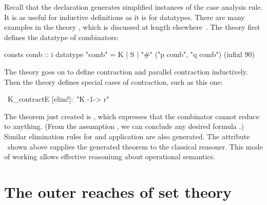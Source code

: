 Recall that the  declaration generates
simplified instances of the case analysis rule.  It is as useful for
inductive definitions as it is for datatypes.  There are many examples
in the theory
, which is discussed at length
elsewhere~\cite{paulson-generic}.  The theory first defines the
datatype
 of combinators:
\begin{alltt*}\isastyleminor
consts comb :: i
datatype  "comb" = K
                 | S
                 | "#" ("p \isasymin comb", "q \isasymin comb")   (infixl 90)
\end{alltt*}
The theory goes on to define contraction and parallel contraction
inductively.  Then the theory  defines special
cases of contraction, such as this one:
\begin{isabelle}
\ K\_contractE [elim!]:\ "K -1-> r"
\end{isabelle}
The theorem just created is ,
which expresses that the combinator  cannot reduce to
anything.  (From the assumption , we can conclude any desired
formula \@.)  Similar elimination rules for  and application are also
generated. The attribute \ shown above supplies the generated
theorem to the classical reasoner.  This mode of working allows
effective reasoniung about operational semantics.

 



\section{The outer reaches of set theory}

